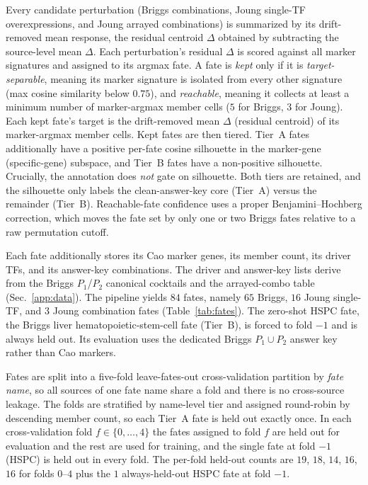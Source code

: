 Every candidate perturbation (Briggs combinations, Joung single-TF overexpressions, and
Joung arrayed combinations) is summarized by its drift-removed mean response, the residual
centroid $\Delta$ obtained by subtracting the source-level mean $\Delta$. Each perturbation's
residual $\Delta$ is scored against all marker signatures and assigned to its argmax fate. A
fate is \emph{kept} only if it is \emph{target-separable}, meaning its marker signature is
isolated from every other signature (max cosine similarity below $0.75$), and
\emph{reachable}, meaning it collects at least a minimum number of marker-argmax member
cells ($5$ for Briggs, $3$ for Joung). Each kept fate's target is the drift-removed mean
$\Delta$ (residual centroid) of its marker-argmax member cells. Kept fates are then tiered.
Tier~A fates additionally have a positive per-fate cosine silhouette in the marker-gene
(specific-gene) subspace, and Tier~B fates have a non-positive silhouette. Crucially, the
annotation does \emph{not} gate on silhouette. Both tiers are retained, and the silhouette
only labels the clean-answer-key core (Tier~A) versus the remainder (Tier~B). Reachable-fate
confidence uses a proper Benjamini--Hochberg correction, which moves the fate set by only one
or two Briggs fates relative to a raw permutation cutoff.

Each fate additionally stores its Cao marker genes, its member count, its driver TFs, and its
answer-key combinations. The driver and answer-key lists derive from the Briggs $P_1$/$P_2$
canonical cocktails and the arrayed-combo table (Sec.~\ref{app:data}). The pipeline yields
$84$ fates, namely $65$ Briggs, $16$ Joung single-TF, and $3$ Joung combination fates
(Table~\ref{tab:fates}). The zero-shot HSPC fate,
the Briggs liver hematopoietic-stem-cell fate (Tier~B), is forced to fold $-1$ and is always
held out. Its evaluation uses the dedicated Briggs $P_1\cup P_2$ answer key rather than Cao
markers.

Fates are split into a five-fold leave-fates-out cross-validation partition by \emph{fate
name}, so all sources of one fate name share a fold and there is no cross-source leakage. The
folds are stratified by name-level tier and assigned round-robin by descending member count,
so each Tier~A fate is held out exactly once. In each cross-validation fold $f\in\{0,\dots,4\}$
the fates assigned to fold $f$ are held out for evaluation and the rest are used for
training, and the single fate at fold $-1$ (HSPC) is held out in every fold. The per-fold
held-out counts are $19$, $18$, $14$, $16$, $16$ for folds $0$--$4$ plus the $1$ always-held-out
HSPC fate at fold $-1$.

